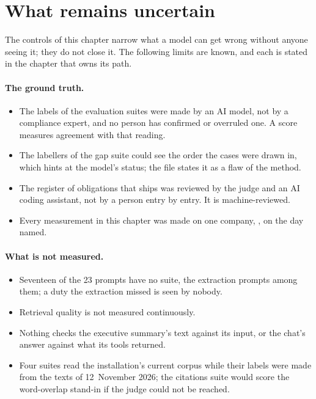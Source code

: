\section{What remains uncertain}\label{sec:control:limits}

The controls of this chapter narrow what a model can get wrong without anyone seeing it; they
do not close it. The following limits are known, and each is stated in the chapter that owns
its path.

\paragraph{The ground truth.}
\begin{itemize}
  \item The labels of the evaluation suites were made by an AI model, not by a compliance
    expert, and no person has confirmed or overruled one. A score measures agreement with
    that reading.
  \item The labellers of the gap suite could see the order the cases were drawn in, which
    hints at the model's status; the file states it as a flaw of the method.
  \item The register of obligations that ships was reviewed by the judge and an AI coding
    assistant, not by a person entry by entry. It is machine-reviewed.
  \item Every measurement in this chapter was made on one company, \demo, on the day named.
\end{itemize}

\paragraph{What is not measured.}
\begin{itemize}
  \item Seventeen of the 23 prompts have no suite, the extraction prompts among them; a duty
    the extraction missed is seen by nobody.
  \item Retrieval quality is not measured continuously.
  \item Nothing checks the executive summary's text against its input, or the chat's answer
    against what its tools returned.
  \item Four suites read the installation's current corpus while their labels were made from
    the texts of 12~November 2026; the citations suite would score the word-overlap stand-in
    if the judge could not be reached.
\end{itemize}

